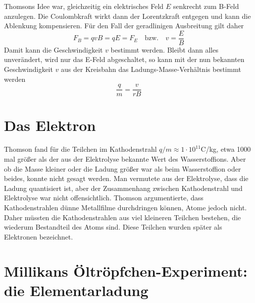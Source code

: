 Thomsons Idee war, gleichzeitig ein elektrisches Feld $E$ senkrecht zum B-Feld anzulegen. Die Coulombkraft wirkt dann der Lorentzkraft entgegen und kann die Ablenkung kompensieren. Für den Fall der geradlinigen Ausbreitung gilt daher
\begin{equation}
    F_B = q v B = q E = F_E  \quad \text{bzw.} \quad v = \frac{E}{B} 
\end{equation}
Damit kann die Geschwindigkeit $v$ bestimmt werden. Bleibt dann alles unverändert, wird nur das E-Feld abgeschaltet, so kann mit der nun bekannten Geschwindigkeit $v$ aus der Kreisbahn das Ladungs-Masse-Verhältnis bestimmt werden
\begin{equation}
    \frac{q}{m} = \frac{v}{r B}
\end{equation}

\section{Das Elektron}

Thomson fand für die Teilchen im Kathodenstrahl $q/m \approx 1 \cdot 10^{11}$C/kg, etwa 1000 mal größer als der aus der Elektrolyse bekannte Wert des Wasserstoffions. Aber ob die Masse kleiner oder die Ladung größer war als beim Wasserstoffion oder beides, konnte nicht gesagt werden. Man vermutete aus der Elektrolyse, dass die Ladung quantisiert ist, aber der Zusammenhang zwischen Kathodenstrahl und Elektrolyse war nicht offensichtlich. Thomson argumentierte, dass Kathodenstrahlen dünne Metallfilme durchdringen können, Atome jedoch nicht. Daher müssten die Kathodenstrahlen aus viel kleineren Teilchen bestehen, die wiederum Bestandteil des Atoms sind. Diese Teilchen wurden später als Elektronen bezeichnet.

\section{Millikans Öltröpfchen-Experiment: die Elementarladung}

